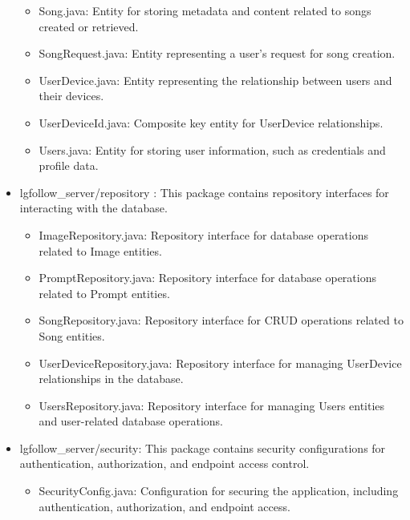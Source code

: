\documentclass[conference]{IEEEtran}
\begin{document}
\begin{itemize}
\begin{itemize}
        \item Song.java: Entity for storing metadata and content related to songs created or retrieved. \\
        \item SongRequest.java: Entity representing a user's request for song creation. \\
        \item UserDevice.java: Entity representing the relationship between users and their devices. \\
        \item UserDeviceId.java: Composite key entity for UserDevice relationships. \\
        \item Users.java: Entity for storing user information, such as credentials and profile data. \\
    \end{itemize}
    \item lgfollow\_server/repository : This package contains repository interfaces for interacting with the database.
    \begin{itemize}
        \item ImageRepository.java: Repository interface for database operations related to Image entities. \\
        \item PromptRepository.java: Repository interface for database operations related to Prompt entities. \\
        \item SongRepository.java: Repository interface for CRUD operations related to Song entities. \\
        \item UserDeviceRepository.java: Repository interface for managing UserDevice relationships in the database. \\
        \item UsersRepository.java: Repository interface for managing Users entities and user-related database operations. \\
    \end{itemize}
    \item lgfollow\_server/security: This package contains security configurations for authentication, authorization, and endpoint access control.
    \begin{itemize}
        \item SecurityConfig.java: Configuration for securing the application, including authentication, authorization, and endpoint access. \\

\end{itemize}
\end{itemize}
\end{document}
